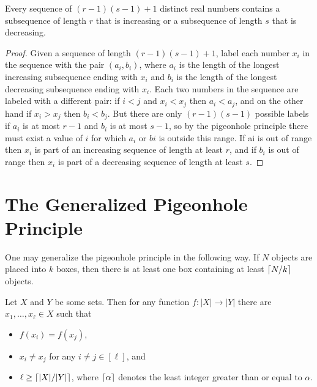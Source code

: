 \begin{theorem}
  Every sequence of $(r - 1)(s - 1) + 1$ distinct real numbers contains a
  subsequence of length $r$ that is increasing or a
  subsequence of length $s$ that is decreasing.
\end{theorem}
\begin{proof}
  Given a sequence of length $(r - 1)(s - 1) + 1$, label each number $x_i$ in
  the sequence with the pair $(a_i, b_i)$, where $a_i$ is the length of the
  longest increasing subsequence ending with $x_i$ and $b_i$ is
  the length of the longest decreasing subsequence ending with $x_i$.
  Each two numbers in the sequence are labeled with a different pair: if $i < j$
  and $x_i < x_j$ then $a_i < a_j$, and on the other hand if $x_i > x_j$ then
  $b_i < b_j$. But there are only $(r - 1)(s - 1)$ possible labels if $a_i$ is
  at most $r - 1$ and $b_i$ is at most $s - 1$, so by the pigeonhole principle
  there must exist a value of $i$ for which $a_i$ or $bi$ is outside this
  range. If ai is out of range then $x_i$ is part of an increasing sequence of
  length at least $r$, and if $b_i$ is out of range then $x_i$ is part of a
  decreasing sequence of length at least $s$.
\end{proof}

\section{The Generalized Pigeonhole Principle}
One may generalize the pigeonhole principle in the following way.
If $N$ objects are placed into $k$ boxes, then there is at least one box
containing at least $\left\lceil {N / k} \right\rceil$ objects.
\begin{theorem}
\label{theorem:generalized-pigeonhole-principle}
  Let $X$ and $Y$ be some sets. Then for any function $f : |X| \to |Y|$ there
  are $x_1, \dots, x_\ell \in X$ such that
  \begin{itemize}
    \item $f(x_i) = f(x_j)$,
    \item $x_i \neq x_j$ for any $i \neq j \in [\ell]$, and
    \item $\ell \ge \left\lceil {|X| / |Y|} \right\rceil$, where $\left\lceil {\alpha} \right\rceil$ denotes the least
      integer greater than or equal to $\alpha$.
  \end{itemize}
\end{theorem}

